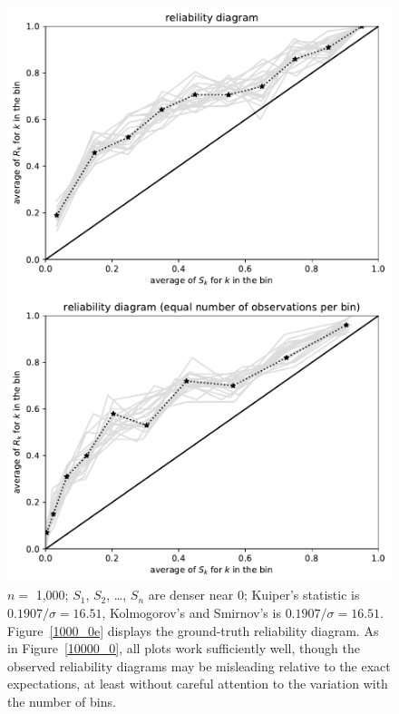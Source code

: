 \documentclass{article}
\begin{document}
\begin{figure}
\begin{centering}
\parbox{\imsize}{\includegraphics[width=\imsize]
                {./codes/unweighted/1000_10_1_2/equiprob.pdf}}
\quad\quad
\parbox{\imsize}{\includegraphics[width=\imsize]
                {./codes/unweighted/1000_10_1_2/equisamp.pdf}}

\end{centering}
\caption{$n =$ 1,000; $S_1$, $S_2$, \dots, $S_n$ are denser near 0;
         Kuiper's statistic is $0.1907 / \sigma = 16.51$,
         Kolmogorov's and Smirnov's is $0.1907 / \sigma = 16.51$.
Figure~\ref{1000_0e} displays the ground-truth reliability diagram.
As in Figure~\ref{10000_0}, all plots work sufficiently well,
though the observed reliability diagrams may be misleading
relative to the exact expectations,
at least without careful attention to the variation with the number of bins.
}
\label{1000_0}
\end{figure}
\end{document}
